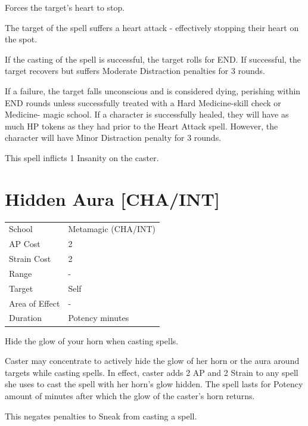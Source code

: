 \documentclass[11pt,a4paper,twocolumn]{book}
\begin{document}
\medskip

Forces the target's heart to stop.

The target of the spell suffers a heart attack - effectively stopping their heart on the spot.

If the casting of the spell is successful, the target rolls for END. If successful, the target recovers but suffers Moderate Distraction penalties for 3 rounds.

If a failure, the target falls unconscious and is considered dying, perishing within END rounds unless successfully treated with a Hard Medicine-skill check or Medicine- magic school. If a character is successfully healed, they will have as much HP tokens as they had prior to the Heart Attack spell. However, the character will have Minor Distraction penalty for 3 rounds.

This spell inflicts 1 Insanity on the caster.


\section*{Hidden Aura [CHA/INT]}
{
	\begin{tabu} to 75mm{| X[l,4] | X[l,7] |}
		\hline
		School 			& Metamagic (CHA/INT) 	\\
        AP Cost	      	& 2 					\\
        Strain Cost     & 2 					\\
        Range     		& - 					\\
        Target      	& Self					\\
        Area of Effect  & -  	 				\\
        Duration     	& Potency minutes		\\ \hline
	\end{tabu}
		
}

\medskip

Hide the glow of your horn when casting spells.

Caster may concentrate to actively hide the glow of her horn or the aura around targets while casting spells. In effect, caster adds 2 AP and 2 Strain to any spell she uses to cast the spell with her horn's glow hidden. The spell lasts for Potency amount of minutes after which the glow of the caster's horn returns.

This negates penalties to Sneak from casting a spell.
\end{document}
